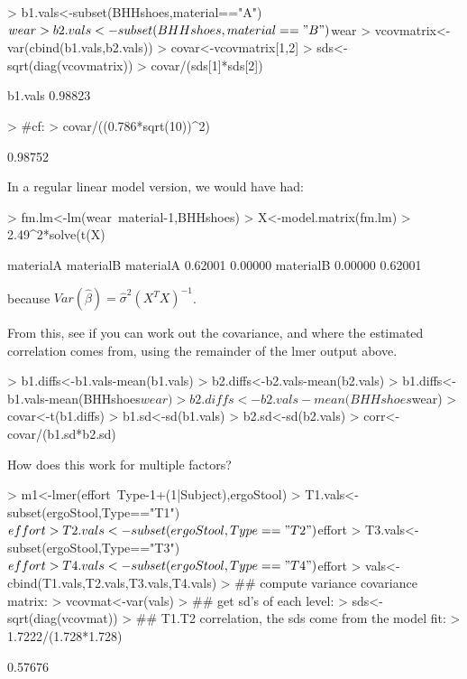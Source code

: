 \documentclass[12pt]{amsart}
\begin{document}
\begin{Schunk}
\begin{Sinput}
> b1.vals<-subset(BHHshoes,material=="A")$wear
> b2.vals<-subset(BHHshoes,material=="B")$wear
> vcovmatrix<-var(cbind(b1.vals,b2.vals))
> covar<-vcovmatrix[1,2]
> sds<-sqrt(diag(vcovmatrix))
> covar/(sds[1]*sds[2])
\end{Sinput}
\begin{Soutput}
b1.vals 
0.98823 
\end{Soutput}
\begin{Sinput}
> #cf:
> covar/((0.786*sqrt(10))^2)  
\end{Sinput}
\begin{Soutput}
[1] 0.98752
\end{Soutput}
\end{Schunk}

In a regular linear model version, we would have had:

\begin{Schunk}
\begin{Sinput}
> fm.lm<-lm(wear~material-1,BHHshoes)
> X<-model.matrix(fm.lm)
> 2.49^2*solve(t(X)%*%X)
\end{Sinput}
\begin{Soutput}
          materialA materialB
materialA   0.62001   0.00000
materialB   0.00000   0.62001
\end{Soutput}
\end{Schunk}

because $Var(\hat{\beta}) = \hat{\sigma}^2 (X^T X)^{-1}$.

From this, see if you can work out the covariance, and where the estimated correlation comes from, using the remainder of the lmer output above.

\begin{Schunk}
\begin{Sinput}
> b1.diffs<-b1.vals-mean(b1.vals)
> b2.diffs<-b2.vals-mean(b2.vals)
> b1.diffs<-b1.vals-mean(BHHshoes$wear)
> b2.diffs<-b2.vals-mean(BHHshoes$wear)
> covar<-t(b1.diffs)%*%b2.diffs
> b1.sd<-sd(b1.vals)
> b2.sd<-sd(b2.vals)
> corr<-covar/(b1.sd*b2.sd)
\end{Sinput}
\end{Schunk}

How does this work for multiple factors?

\begin{Schunk}
\begin{Sinput}
> m1<-lmer(effort~Type-1+(1|Subject),ergoStool)
> T1.vals<-subset(ergoStool,Type=="T1")$effort
> T2.vals<-subset(ergoStool,Type=="T2")$effort
> T3.vals<-subset(ergoStool,Type=="T3")$effort
> T4.vals<-subset(ergoStool,Type=="T4")$effort
> vals<-cbind(T1.vals,T2.vals,T3.vals,T4.vals)
> ## compute variance covariance matrix:
> vcovmat<-var(vals)
> ## get sd's of each level:
> sds<-sqrt(diag(vcovmat))
> ## T1.T2 correlation, the sds come from the model fit:
> 1.7222/(1.728*1.728)
\end{Sinput}
\begin{Soutput}
[1] 0.57676
\end{Soutput}
\end{Schunk}
\end{document}
